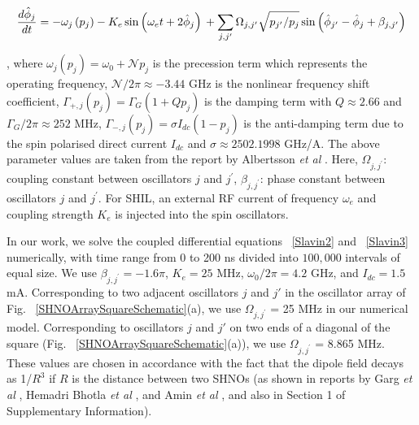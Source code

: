 \documentclass[10pt]{article}
\begin{document}
\begin{equation}
\frac{d\hat{\phi}_j}{d t}=-\omega_j\left(p_j\right)-K_e \sin \left(\omega_e t+2 \hat{\phi}_j\right) \\
+\sum_{j, j^{\prime}} \Omega_{j, j^{\prime}} \sqrt{p_{j^{\prime}} / p_j} \sin \left(\hat{\phi}_{j^{\prime}}-\hat{\phi}_j+\beta_{j, j^{\prime}}\right)
\label{Slavin3}
\end{equation}






, where $\omega_j\left(p_j\right)= \omega_0+\mathcal{N}p_j$ is the precession term which represents the operating frequency, $\mathcal{N}/2\pi\approx -3.44$ GHz is the nonlinear frequency shift coefficient, $\Gamma_{+, j}\left(p_j\right)=\Gamma_{G}(1+Qp_j)$ is the damping term with $Q\approx2.66$ and $\Gamma_{G}/2\pi\approx 252$ MHz, $\Gamma_{-, j}\left(p_j\right)=\sigma I_{dc}(1-p_j)$ is the anti-damping term due to the spin polarised direct current $I_{dc}$ and $\sigma \approx 2502.1998$ GHz/A. The above parameter values are taken from the report by Albertsson \textit{et al} \cite{Spin_Akerman3}. Here, $\Omega_{j, j^{\prime}}$: coupling constant between oscillators $j$ and $j^{\prime}$, $\beta_{j, j^{\prime}}$: phase constant between oscillators $j$ and $j^{\prime}$. For SHIL, an external RF current of frequency $\omega_e$ and coupling strength $K_e$  is injected into the spin oscillators. 

In our work, we solve the coupled differential equations ~\ref{Slavin2} and ~\ref{Slavin3} numerically, with time range from 0 to 200 ns divided into $100,000$ intervals of equal size. We use $\beta_{j, j^{\prime}}=-1.6\pi$, $K_e=25$ MHz, $\omega_0/2\pi=4.2$ GHz, and $I_{dc}=1.5$ mA. Corresponding to two adjacent oscillators $j$ and $j'$ in the oscillator array of Fig. ~\ref{SHNOArraySquareSchematic}(a), we use $\Omega_{j, j^{\prime}}$ = 25 MHz in our numerical model. Corresponding to oscillators $j$ and $j'$ on two ends of a diagonal of the square (Fig. ~\ref{SHNOArraySquareSchematic}(a)), we use $\Omega_{j, j^{\prime}}$ = 8.865  MHz. These values are chosen in accordance with the fact that the dipole field decays as 1/$R^3$ if $R$ is the distance between two SHNOs (as shown in reports by Garg \textit{et al} \cite{Spin_DB1}, Hemadri Bhotla \textit{et al} \cite{Spin_DB2}, and Amin \textit{et al} \cite{Amin}, and also in Section 1 of Supplementary Information). 




\end{document}
